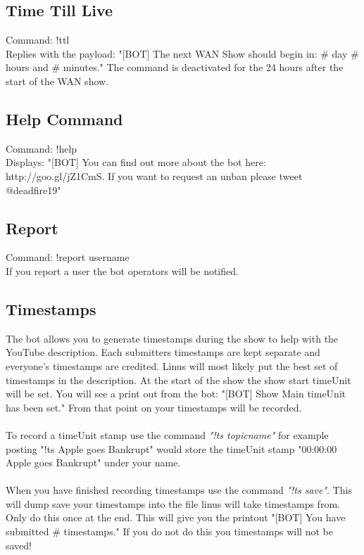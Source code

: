 \documentclass[10pt]{article}
\begin{document}
\subsection{Time Till Live}
Command: !ttl\\
Replies with the payload: "[BOT] The next WAN Show should begin in: \# day \# hours and \# minutes."
The command is deactivated for the 24 hours after the start of the WAN show.
\subsection{Help Command}
Command: !help\\
Displays: "[BOT] You can find out more about the bot here: http://goo.gl/jZ1CmS. If you want to request an unban please tweet @deadfire19"
\subsection{Report}
Command: !report username\\
If you report a user the bot operators will be notified.
\subsection{Timestamps}
The bot allows you to generate timestamps during the show to help with the YouTube description. Each submitters timestamps are kept separate and everyone's timestamps are credited. Linus will most likely put the best set of timestamps in the description. At the start of the show the show start timeUnit will be set. You will see a print out from the bot: "[BOT] Show Main timeUnit has been set." From that point on your timestamps will be recorded.\\\\
 
To record a timeUnit stamp use the command \emph{"!ts topicname"} for example posting  "!ts Apple goes Bankrupt" would store the timeUnit stamp "00:00:00 Apple goes Bankrupt" under your name.
 \\\\
When you have finished recording timestamps use the command \emph{"!ts save"}. This will dump save your timestamps into the file linus will take timestamps from. Only do this once at the end. This will give you the printout "[BOT] You have submitted \# timestamps." If you do not do this you timestamps will not be saved!
\end{document}

